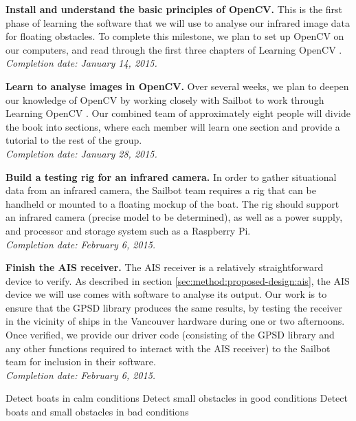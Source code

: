\textbf{Install and understand the basic principles of OpenCV.} This is the first phase of learning the software that we will use to analyse our infrared image data for floating obstacles. To complete this milestone, we plan to set up OpenCV on our computers, and read through the first three chapters of Learning OpenCV \cite{kaehler__learning-opencv}.\\\textit{Completion date: January 14, 2015.}
\par
\textbf{Learn to analyse images in OpenCV.} Over several weeks, we plan to deepen our knowledge of OpenCV by working closely with Sailbot to work through Learning OpenCV \cite{kaehler__learning-opencv}. Our combined team of approximately eight people will divide the book into sections, where each member will learn one section and provide a tutorial to the rest of the group.\\\textit{Completion date: January 28, 2015.}
\par
\textbf{Build a testing rig for an infrared camera.} In order to gather situational data from an infrared camera, the Sailbot team requires a rig that can be handheld or mounted to a floating mockup of the boat. The rig should support an infrared camera (precise model to be determined), as well as a power supply, and processor and storage system such as a Raspberry Pi.\\\textit{Completion date: February 6, 2015.}
\par
\textbf{Finish the AIS receiver.} The AIS receiver is a relatively straightforward device to verify. As described in section \ref{sec:method:proposed-design:ais}, the AIS device we will use comes with software to analyse its output. Our work is to ensure that the GPSD library produces the same results, by testing the receiver in the vicinity of ships in the Vancouver hardware during one or two afternoons. Once verified, we provide our driver code (consisting of the GPSD library and any other functions required to interact with the AIS receiver) to the Sailbot team for inclusion in their software.\\\textit{Completion date: February 6, 2015.}
\par
Detect boats in calm conditions
Detect small obstacles in good conditions
Detect boats and small obstacles in bad conditions
